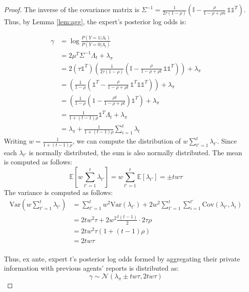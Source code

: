 \documentclass{winnower}
\begin{document}
\begin{proof}
The inverse of the covariance matrix is $\Sigma^{-1} = \frac{1}{2\tau(1 - \rho)} \left( \mathbb{I} - \frac{\rho}{1 - \rho + \rho n} \, \mathds{1}\mathds{1}^T \right)$. Thus, by Lemma \ref{lem:agg}, the expert's posterior log odds is:

{\small
\begin{equation}
    \begin{split}
        \gamma &= \log \frac{P(Y= 1| \Lambda_t)}{P(Y= 0|\Lambda_t)} \\
        &= 2{\mu}^T\Sigma^{-1}{\Lambda_t} + \lambda_\pi\\
        &= 2\left(\tau \mathds{1}^T\right)\left( \frac{1}{2\tau(1 - \rho)} \left( \mathbb{I} - \frac{\rho}{1 - \rho + \rho t} \, \mathds{1}\mathds{1}^T \right)\right) + \lambda_\pi\\
        &= \left( \frac{1}{1 - \rho} \left( \mathds{1}^T - \frac{\rho}{1 - \rho + \rho t} \, \mathds{1}^T\mathds{1}\mathds{1}^T \right)\right) + \lambda_\pi\\
        &= \left( \frac{1}{1 - \rho} \left( 1- \frac{\rho t}{1 - \rho + \rho t}  \right)\mathds{1}^T\right) + \lambda_\pi\\
        &= \frac{1}{1 + (t-1)\rho}  \mathds{1}^T \Lambda_t + \lambda_\pi\\
        &= \lambda_\pi + \frac{1}{1 + (t-1)\rho} \sum_{i=1}^t \lambda_t
    \end{split}
\end{equation}
}
Writing $w = \frac{1}{1 + (t-1)\rho}$, we can compute the distribution of $w\sum_{t'=1}^t \lambda_{t'}$. Since each $\lambda_{t'}$ is normally distributed, the sum is also normally distributed.  The mean is computed as follows:
\begin{equation}
        \mathds{E}\left[w\sum_{t'=1}^t \lambda_{t'}\right] = w\sum_{t'=1}^t \mathds{E}\left[\lambda_{t'}\right] = \pm tw\tau
\end{equation}
The variance is computed as follows:
\begin{equation}
\begin{split}
    \text{Var}\left(w\sum_{t'=1}^t \lambda_{t'}\right) &= \sum_{t'=1}^t w^2 \text{Var}\left(\lambda_{t'}\right) + 2 w^2 \sum_{t'=1}^t\sum_{i=1}^{t'} \text{Cov}\left(\lambda_{t'}, \lambda_{i}\right) \\
    &=   2tw^2\tau + 2 w^2  \frac{t(t-1)}{2} \cdot 2\tau\rho \\
    &=   2tw^2\tau (1 +  (t-1)\rho) \\
    &=   2tw\tau \\
\end{split}
\end{equation}

Thus, ex ante, expert $t$'s posterior log odds formed by aggregating their private information with previous agents' reports is distributed as:
\begin{equation}
    \gamma \sim \mathcal{N}\left( \lambda_\pi  \pm tw\tau , 2tw\tau\right)
\end{equation}

\end{proof}
\end{document}
